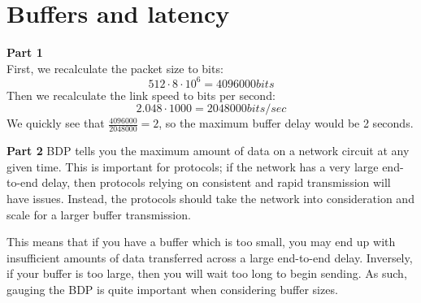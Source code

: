 \section{Buffers and latency}
\textbf{Part 1}\\
First, we recalculate the packet size to bits:
\[
512 \cdot 8 \cdot 10^6 = 4096000 bits
\]
Then we recalculate the link speed to bits per second:
\[
2.048 \cdot 1000 = 2048000 bits/sec
\]
We quickly see that $\frac{4096000}{2048000} = 2$, so the maximum buffer delay
would be 2 seconds.

\noindent \textbf{Part 2}
BDP tells you the maximum amount of data on a network circuit at any given time. This is important
for protocols; if the network has a very large end-to-end delay, then protocols relying on consistent
and rapid transmission will have issues. Instead, the protocols should take the network into consideration
and scale for a larger buffer transmission.

This means that if you have a buffer which is too small, you may end up
with insufficient amounts of data transferred across a large end-to-end
delay. Inversely, if your buffer is too large, then you will wait too long
to begin sending. As such, gauging the BDP is quite important when
considering buffer sizes.
